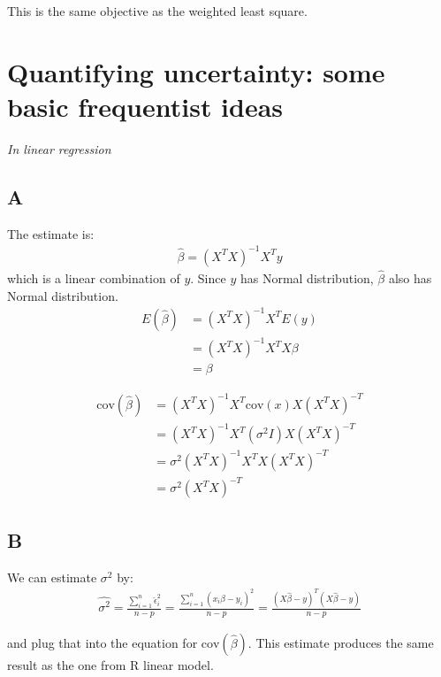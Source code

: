 \documentclass{article}
\begin{document}
This is the same objective as the weighted least square.

\section{Quantifying uncertainty: some basic frequentist ideas}
\textit{In linear regression}
\subsection*{A}

The estimate is:
\begin{align*}
\hat{\beta} = (X^TX)^{-1}X^Ty
\end{align*}
which is a linear combination of \(y\). Since \(y\) has Normal distribution, \(\hat{\beta}\) also has Normal distribution.
\begin{align*}
E(\hat{\beta}) &= (X^TX)^{-1}X^T E(y)\\
&= (X^TX)^{-1}X^T X\beta\\
&= \beta
\end{align*}

\begin{align*}
\mbox{cov}(\hat{\beta}) &= (X^TX)^{-1}X^T \mbox{cov}(x) X(X^TX)^{-T}\\
&= (X^TX)^{-1}X^T (\sigma^2 I) X(X^TX)^{-T}\\
&= \sigma^2 (X^TX)^{-1}X^T  X(X^TX)^{-T}\\
&= \sigma^2 (X^TX)^{-T}
\end{align*}

\subsection*{B}
We can estimate \(\sigma^2\) by:
\begin{align*}
\hat{\sigma^2} = \frac{\sum_{i=1}^n\hat{\epsilon}_i^2}{n-p} = \frac{\sum_{i=1}^n(x_i\hat{\beta} - y_i)^2}{n-p} = \frac{(X\hat{\beta} - y)^T(X\hat{\beta} - y)}{n-p}
\end{align*}

and plug that into the equation for \(\mbox{cov}(\hat{\beta})\).
This estimate produces the same result as the one from R linear model.
 
\end{document}
